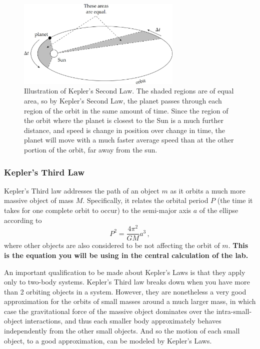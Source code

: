 \begin{figure}
	\centering
	\includegraphics[width=0.7\textwidth]{galactic-center/keplers-2nd-ellipse.png}
	\caption{Illustration of Kepler’s Second Law. The shaded regions are of equal area, so by Kepler’s Second Law, the
		planet passes through each region of the orbit in the same amount of time. Since the region of the orbit
		where the planet is closest to the Sun is a much further distance, and speed is change in position over
		change in time, the planet will move with a much faster average speed than at the other portion of the
		orbit, far away from the sun.}\label{gc:fig:keplers-2nd-ellipse}
\end{figure}
\subsubsection{Kepler's Third Law}
Kepler’s Third law addresses the path of an object $m$ as it orbits a much more massive object of mass $M$. Specifically, it relates the orbital period $P$ (the time it takes for one complete orbit to occur) to the semi-major axis $a$ of the ellipse according to
\begin{equation}\label{gc:eq:kepler-3}
	P^2 = \frac{4 \pi^2}{G M} a^3 \,,
\end{equation}
where other objects are also considered to be not affecting the orbit of $m$. \textbf{This is the
	equation you will be using in the central calculation of the lab.}

An important qualification to be made about Kepler’s Laws is that they apply only to two-body
systems. Kepler’s Third law breaks down when you have more than 2 orbiting objects in a system.
However, they are nonetheless a very good approximation for the orbits of small masses around a much
larger mass, in which case the gravitational force of the massive object dominates over the intra-small-
object interactions, and thus each smaller body approximately behaves independently from the other
small objects. And so the motion of each small object, to a good approximation, can be modeled by
Kepler’s Laws.

